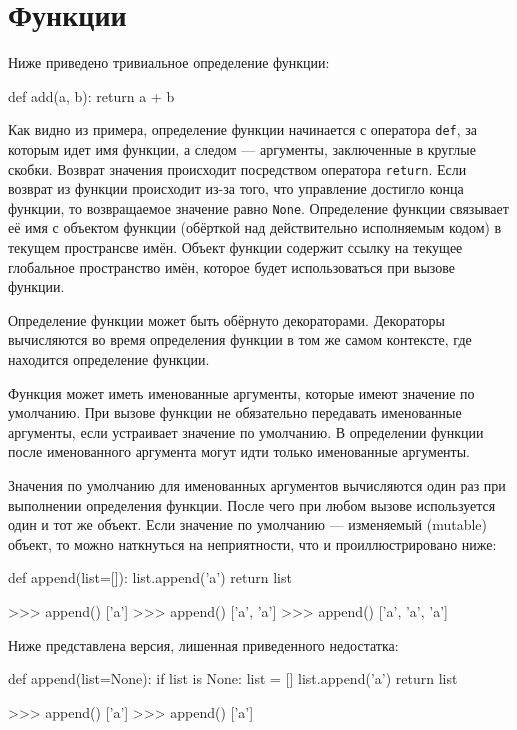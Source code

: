 \section{Функции}
Ниже приведено тривиальное определение функции:
\begin{pylst}{}{}
def add(a, b):
    return a + b
\end{pylst}

Как видно из примера, определение функции начинается с оператора \lstinline{def}, за которым идет имя функции, а следом --- аргументы, заключенные в круглые скобки. Возврат значения происходит посредством оператора \lstinline{return}. Если возврат из функции происходит из-за того, что управление достигло конца функции, то возвращаемое значение равно \lstinline{None}. Определение функции связывает её имя с объектом функции (обёрткой над действительно исполняемым кодом) в текущем пространсве имён. Объект функции содержит ссылку на текущее глобальное пространство имён, которое будет использоваться при вызове функции.

Определение функции может быть обёрнуто декораторами. Декораторы вычисляются во время определения функции в том же самом контексте, где находится определение функции.

Функция может иметь именованные аргументы, которые имеют значение по умолчанию. При вызове функции не обязательно передавать именованные аргументы, если устраивает значение по умолчанию. В определении функции после именованного аргумента могут идти только именованные аргументы.

Значения по умолчанию для именованных аргументов вычисляются один раз при выполнении определения функции. После чего при любом вызове используется один и тот же объект. Если значение по умолчанию --- изменяемый (mutable) объект, то можно наткнуться на неприятности, что и проиллюстрировано ниже:
\begin{pylst}{}{}
def append(list=[]):
    list.append('a')
    return list

>>> append()
['a']
>>> append()
['a', 'a']
>>> append()
['a', 'a', 'a']
\end{pylst}

Ниже представлена версия, лишенная приведенного недостатка:
\begin{pylst}{}{}
def append(list=None):
    if list is None:
        list = []
    list.append('a')
    return list

>>> append()
['a']
>>> append()
['a']
\end{pylst}

